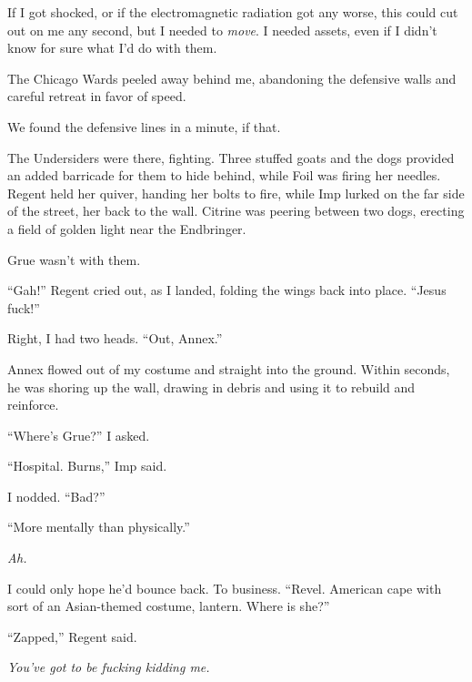If I got shocked, or if the electromagnetic radiation got any worse, this could cut out on me any second, but I needed to \emph{move}.  I needed assets, even if I didn't know for sure what I'd do with them.



The Chicago Wards peeled away behind me, abandoning the defensive walls and careful retreat in favor of speed.



We found the defensive lines in a minute, if that.



The Undersiders were there, fighting.  Three stuffed goats and the dogs provided an added barricade for them to hide behind, while Foil was firing her needles.  Regent held her quiver, handing her bolts to fire, while Imp lurked on the far side of the street, her back to the wall.  Citrine was peering between two dogs, erecting a field of golden light near the Endbringer.



Grue wasn't with them.



``Gah!''  Regent cried out, as I landed, folding the wings back into place.  ``Jesus fuck!''



Right, I had two heads.  ``Out, Annex.''



Annex flowed out of my costume and straight into the ground.  Within seconds, he was shoring up the wall, drawing in debris and using it to rebuild and reinforce.



``Where's Grue?'' I asked.



``Hospital.  Burns,'' Imp said.



I nodded.  ``Bad?''



``More mentally than physically.''



\emph{Ah.}



I could only hope he'd bounce back.  To business. ``Revel.  American cape with sort of an Asian-themed costume, lantern.  Where is she?''



``Zapped,'' Regent said.



\emph{You've got to be fucking kidding me.}




